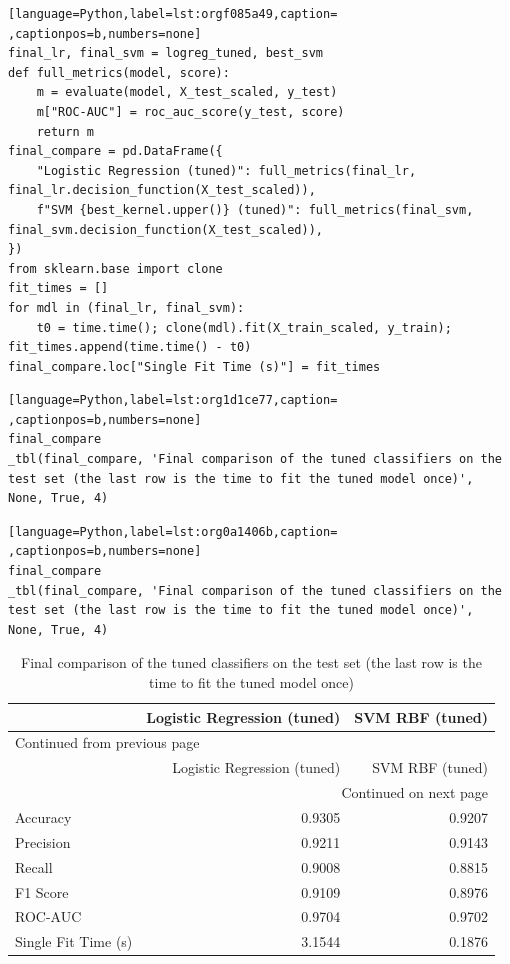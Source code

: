 \documentclass[11pt]{article}
\begin{document}
\begin{lstlisting}[language=Python,label=lst:orgf085a49,caption= ,captionpos=b,numbers=none]
final_lr, final_svm = logreg_tuned, best_svm
def full_metrics(model, score):
    m = evaluate(model, X_test_scaled, y_test)
    m["ROC-AUC"] = roc_auc_score(y_test, score)
    return m
final_compare = pd.DataFrame({
    "Logistic Regression (tuned)": full_metrics(final_lr, final_lr.decision_function(X_test_scaled)),
    f"SVM {best_kernel.upper()} (tuned)": full_metrics(final_svm, final_svm.decision_function(X_test_scaled)),
})
from sklearn.base import clone
fit_times = []
for mdl in (final_lr, final_svm):
    t0 = time.time(); clone(mdl).fit(X_train_scaled, y_train); fit_times.append(time.time() - t0)
final_compare.loc["Single Fit Time (s)"] = fit_times
\end{lstlisting}

\begin{lstlisting}[language=Python,label=lst:org1d1ce77,caption= ,captionpos=b,numbers=none]
final_compare
_tbl(final_compare, 'Final comparison of the tuned classifiers on the test set (the last row is the time to fit the tuned model once)', None, True, 4)
\end{lstlisting}
\begin{lstlisting}[language=Python,label=lst:org0a1406b,caption= ,captionpos=b,numbers=none]
final_compare
_tbl(final_compare, 'Final comparison of the tuned classifiers on the test set (the last row is the time to fit the tuned model once)', None, True, 4)
\end{lstlisting}

\begin{longtable}{|l|r|r|}
\caption{Final comparison of the tuned classifiers on the test set (the last row is the time to fit the tuned model once)}
\\[0pt]
\hline
 & Logistic Regression (tuned) & SVM RBF (tuned)\\[0pt]
\hline
\endfirsthead
\multicolumn{3}{l}{Continued from previous page} \\[0pt]
\hline

 & Logistic Regression (tuned) & SVM RBF (tuned) \\[0pt]

\hline
\endhead
\hline\multicolumn{3}{r}{Continued on next page} \\
\endfoot
\endlastfoot
\hline
Accuracy & 0.9305 & 0.9207\\[0pt]
\hline
Precision & 0.9211 & 0.9143\\[0pt]
\hline
Recall & 0.9008 & 0.8815\\[0pt]
\hline
F1 Score & 0.9109 & 0.8976\\[0pt]
\hline
ROC-AUC & 0.9704 & 0.9702\\[0pt]
\hline
Single Fit Time (s) & 3.1544 & 0.1876\\[0pt]
\hline
\end{longtable}
\end{document}

